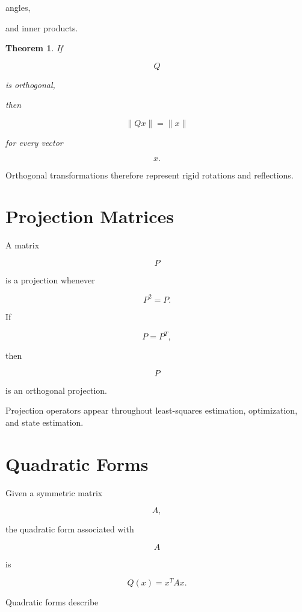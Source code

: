 \documentclass[11pt,fleqn]{book}
\numberwithin{equation}{chapter}
\theoremstyle{plain}
\newtheorem{theorem}{Theorem}[chapter]
\theoremstyle{definition}
\theoremstyle{remark}
\begin{document}
angles,

and inner products.


\begin{theorem}

If

\[
Q
\]

is orthogonal,

then

\[
\|Qx\|
=
\|x\|
\]

for every vector

\[
x.
\]

\end{theorem}

Orthogonal transformations therefore represent rigid rotations and
reflections.


\section{Projection Matrices}

A matrix

\[
P
\]

is a projection whenever

\[
P^2=P.
\]

If

\[
P=P^T,
\]

then

\[
P
\]

is an orthogonal projection.

Projection operators appear throughout least-squares estimation,
optimization, and state estimation.


\section{Quadratic Forms}

Given a symmetric matrix

\[
A,
\]

the quadratic form associated with

\[
A
\]

is

\[
\boxed{
Q(x)
=
x^TAx.
}
\]

Quadratic forms describe
\end{document}
